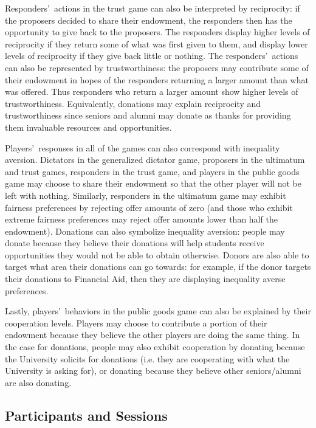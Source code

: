 \documentclass[12pt]{article}
\begin{document}
Responders\rq \ actions in the trust game can also be interpreted by reciprocity: if the proposers decided to share their endowment, the responders then has the opportunity to give back to the proposers. The responders display higher levels of reciprocity if they return some of what was first given to them, and display lower levels of reciprocity if they give back little or nothing. The responders\rq \ actions can also be represented by trustworthiness: the proposers may contribute some of their endowment in hopes of the responders returning a larger amount than what was offered. Thus responders who return a larger amount show higher levels of trustworthiness. Equivalently, donations may explain reciprocity and trustworthiness since seniors and alumni may donate as thanks for providing them invaluable resources and opportunities.

Players\rq \ responses in all of the games can also correspond with inequality aversion. Dictators in the generalized dictator game, proposers in the ultimatum and trust games, responders in the trust game, and players in the public goods game may choose to share their endowment so that the other player will not be left with nothing. Similarly, responders in the ultimatum game may exhibit fairness preferences by rejecting offer amounts of zero (and those who exhibit extreme fairness preferences may reject offer amounts lower than half the endowment). Donations can also symbolize inequality aversion: people may donate because they believe their donations will help students receive opportunities they would not be able to obtain otherwise. Donors are also able to target what area their donations can go towards: for example, if the donor targets their donations to Financial Aid, then they are displaying inequality averse preferences.

Lastly, players\rq \ behaviors in the public goods game can also be explained by their cooperation levels. Players may choose to contribute a portion of their endowment because they believe the other players are doing the same thing. In the case for donations, people may also exhibit cooperation by donating because the University solicits for donations (i.e. they are cooperating with what the University is asking for), or donating because they believe other seniors/alumni are also donating.

	
\subsection{Participants and Sessions}
\end{document}
